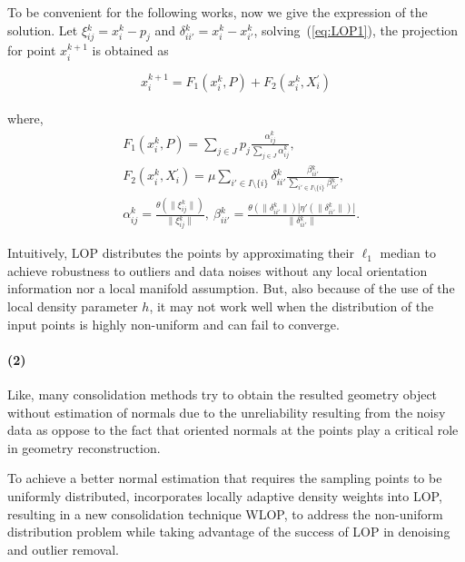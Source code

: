 To be convenient for the following works, now we give the expression of the solution. Let $\xi{_{ij}^k}=x{_i^k}-p_{j}$ and $\delta{_{ii'}^k}=x{_i^k}-x{_{i'}^k}$, solving~(\ref{eq:LOP1}), the projection for point $x{_i^{k+1}}$ is obtained as

\small{
\begin{equation}
 \label{eq:LOP3}
 x{_i^{k+1}}=F_1(x{_i^k},P)+F_2(x{_i^k},X{_i^{'}})
\end{equation}
}
\\
where,
\small{
\begin{equation}
 \label{eq:LOP4}
 \begin{split}
 & F_1(x{_i^k},P)=\sum_{j\in J}^{}p_{j}\frac{\alpha{_{ij}^k}}{\sum_{j\in J}^{}\alpha{_{ij}^k}},\\
 & F_2(x{_i^k},X{_i^{'}})=\mu\sum_{{i'}\in I\setminus\{i\}}^{}\delta{_{ii'}^k}\frac{\beta{_{ii'}^k}}{\sum_{{i'}\in I\setminus\{i\}}^{}\beta{_{ii'}^k}},\\
 & \alpha{_{ij}^k}=\frac{\theta(\|\xi{_{ij}^k}\|)}{\|\xi{_{ij}^k}\|},
   ~\beta{_{ii'}^k}=\frac{\theta(\|\delta{_{ii'}^k}\|)|\eta'(\|\delta{_{ii'}^k}\|)|}{\|\delta{_{ii'}^k}\|}.
 \end{split}
\end{equation}
}

Intuitively, LOP distributes the points by approximating their $\ell_1$ median to achieve robustness to outliers and data noises without any local orientation information nor a local manifold assumption.
But, also because of the use of the local density parameter $h$, it may not work well when the distribution of the input points is highly non-uniform and can fail to converge.

\paragraph{(2)}

Like\cite{lipman2007parameterization}, many consolidation methods try to obtain the resulted geometry object
without estimation of normals due to the unreliability resulting from the noisy data as oppose to the fact that
oriented normals at the points play a critical role in geometry reconstruction.

To achieve a better normal estimation that requires the sampling points to be uniformly distributed,
\cite{huang2009consolidation} incorporates locally adaptive density weights into LOP, resulting in a new consolidation technique WLOP, to address the non-uniform distribution problem while taking advantage of the success of LOP in denoising and outlier removal.


